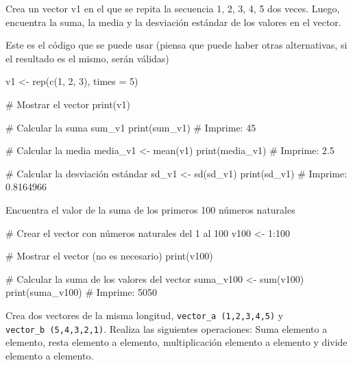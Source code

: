 \documentclass[
  letterpaper,
]{scrbook}
\newenvironment{Shaded}{\begin{snugshade}}{\end{snugshade}}
\newcommand{\AttributeTok}[1]{\textcolor[rgb]{0.40,0.45,0.13}{#1}}
\newcommand{\CommentTok}[1]{\textcolor[rgb]{0.37,0.37,0.37}{#1}}
\newcommand{\DecValTok}[1]{\textcolor[rgb]{0.68,0.00,0.00}{#1}}
\newcommand{\FunctionTok}[1]{\textcolor[rgb]{0.28,0.35,0.67}{#1}}
\newcommand{\NormalTok}[1]{\textcolor[rgb]{0.00,0.23,0.31}{#1}}
\newcommand{\OtherTok}[1]{\textcolor[rgb]{0.00,0.23,0.31}{#1}}
\newcommand{\SpecialCharTok}[1]{\textcolor[rgb]{0.37,0.37,0.37}{#1}}
\begin{document}
Crea un vector v1 en el que se repita la secuencia 1, 2, 3, 4, 5 dos
veces. Luego, encuentra la suma, la media y la desviación estándar de
los valores en el vector.

Este es el código que se puede usar (piensa que puede haber otras
alternativas, si el resultado es el mismo, serán válidas)

\begin{Shaded}
\begin{Highlighting}[]
\NormalTok{v1 }\OtherTok{\textless{}{-}} \FunctionTok{rep}\NormalTok{(}\FunctionTok{c}\NormalTok{(}\DecValTok{1}\NormalTok{, }\DecValTok{2}\NormalTok{, }\DecValTok{3}\NormalTok{), }\AttributeTok{times =} \DecValTok{5}\NormalTok{)}

\CommentTok{\# Mostrar el vector}
\FunctionTok{print}\NormalTok{(v1)}


\CommentTok{\# Calcular la suma}
\NormalTok{sum\_v1}
\FunctionTok{print}\NormalTok{(sum\_v1)}
\CommentTok{\# Imprime: 45}

\CommentTok{\# Calcular la media}
\NormalTok{media\_v1 }\OtherTok{\textless{}{-}} \FunctionTok{mean}\NormalTok{(v1)}
\FunctionTok{print}\NormalTok{(media\_v1)}
\CommentTok{\# Imprime: 2.5}

\CommentTok{\# Calcular la desviación estándar}
\NormalTok{sd\_v1 }\OtherTok{\textless{}{-}} \FunctionTok{sd}\NormalTok{(sd\_v1)}
\FunctionTok{print}\NormalTok{(sd\_v1)}
\CommentTok{\# Imprime: 0.8164966}
\end{Highlighting}
\end{Shaded}

Encuentra el valor de la suma de los primeros 100 números naturales

\begin{Shaded}
\begin{Highlighting}[]
\CommentTok{\# Crear el vector con números naturales del 1 al 100}
\NormalTok{v100 }\OtherTok{\textless{}{-}} \DecValTok{1}\SpecialCharTok{:}\DecValTok{100}

\CommentTok{\# Mostrar el vector (no es necesario)}
\FunctionTok{print}\NormalTok{(v100)}

\CommentTok{\# Calcular la suma de los valores del vector}
\NormalTok{suma\_v100 }\OtherTok{\textless{}{-}} \FunctionTok{sum}\NormalTok{(v100)}
\FunctionTok{print}\NormalTok{(suma\_v100)}
\CommentTok{\# Imprime: 5050}
\end{Highlighting}
\end{Shaded}

Crea dos vectores de la misma longitud, \texttt{vector\_a\ (1,2,3,4,5)}
y \texttt{vector\_b\ (5,4,3,2,1)}. Realiza las siguientes operaciones:
Suma elemento a elemento, resta elemento a elemento, multiplicación
elemento a elemento y divide elemento a elemento.
\end{document}
